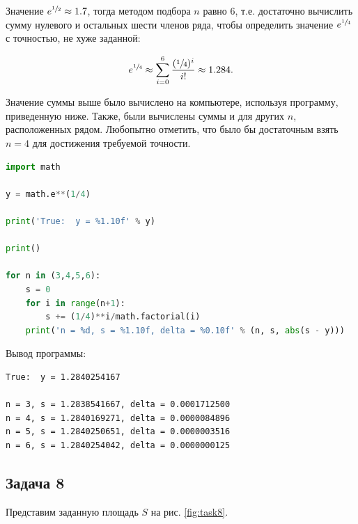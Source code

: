 \documentclass[a4paper,11pt]{article}
\begin{document}
Значение $e^{\sfrac{1}{2}} \approx 1.7$, тогда методом подбора $n$ равно 6, т.е. достаточно вычислить сумму нулевого и остальных шести членов ряда, чтобы определить значение $e^{\sfrac{1}{4}}$ с точностью, не хуже заданной:

\begin{align*}
e^{\sfrac{1}{4}} \approx \sum_{i=0}^{6} \frac{(\sfrac{1}{4})^i}{i!} \approx 1.284.
\end{align*}

Значение суммы выше было вычислено на компьютере, используя программу, приведенную ниже. Также, были вычислены суммы и для других $n$, расположенных рядом. Любопытно отметить, что было бы достаточным взять $n=4$ для достижения требуемой точности.

\begin{lstlisting}[language=Python, caption=Python-скрипт для приближенного вычисления $e^{\sfrac{1}{4}}$]
import math

y = math.e**(1/4)

print('True:  y = %1.10f' % y)

print()

for n in (3,4,5,6):
    s = 0
    for i in range(n+1):
        s += (1/4)**i/math.factorial(i)
    print('n = %d, s = %1.10f, delta = %0.10f' % (n, s, abs(s - y)))
\end{lstlisting}

\vspace{0.5cm}

Вывод программы:

\begin{verbatim}
True:  y = 1.2840254167

n = 3, s = 1.2838541667, delta = 0.0001712500
n = 4, s = 1.2840169271, delta = 0.0000084896
n = 5, s = 1.2840250651, delta = 0.0000003516
n = 6, s = 1.2840254042, delta = 0.0000000125
\end{verbatim}

\subsection{Задача 8}

Представим заданную площадь $S$ на рис. \ref{fig:task8}. 
\end{document}
